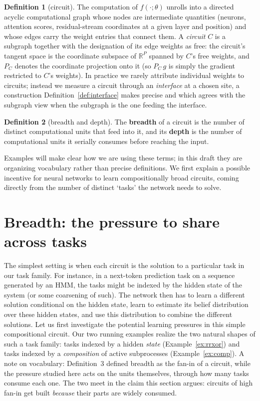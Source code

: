 \documentclass[10pt]{article}
\theoremstyle{definition}
\newtheorem{definition}{Definition}
\begin{document}
\begin{definition}[circuit]\label{def:circuit}
The computation of $f(\cdot;\theta)$ unrolls into a directed acyclic computational graph whose nodes are intermediate quantities (neurons, attention scores, residual-stream coordinates at a given layer and position) and whose edges carry the weight entries that connect them. A \emph{circuit} $C$ is a subgraph together with the designation of its edge weights as free: the circuit's tangent space is the coordinate subspace of $\mathbb{R}^P$ spanned by $C$'s free weights, and $P_C$ denotes the coordinate projection onto it (so $P_C\, g$ is simply the gradient restricted to $C$'s weights). In practice we rarely attribute individual weights to circuits; instead we measure a circuit through an \emph{interface} at a chosen site, a construction Definition~\ref{def:interface} makes precise and which agrees with the subgraph view when the subgraph is the one feeding the interface.
\end{definition}

\begin{definition}[breadth and depth]
The \textbf{breadth} of a circuit is the number of distinct computational units that feed into it, and its \textbf{depth} is the number of computational units it serially consumes before reaching the input.
\end{definition}

Examples will make clear how we are using these terms; in this draft they are organizing vocabulary rather than precise definitions. We first explain a possible incentive for neural networks to learn compositionally broad circuits, coming directly from the number of distinct `tasks' the network needs to solve.

\section{Breadth: the pressure to share across tasks}

The simplest setting is when each circuit is the solution to a particular task in our task family. For instance, in a next-token prediction task on a sequence generated by an HMM, the tasks might be indexed by the hidden state of the system (or some coarsening of such). The network then has to learn a different solution conditional on the hidden state, learn to estimate its belief distribution over these hidden states, and use this distribution to combine the different solutions. Let us first investigate the potential learning pressures in this simple compositional circuit. Our two running examples realize the two natural shapes of such a task family: tasks indexed by a hidden \emph{state} (Example~\ref{ex:rrxor}) and tasks indexed by a \emph{composition} of active subprocesses (Example~\ref{ex:comp}). A note on vocabulary: Definition~3 defined breadth as the fan-in of a circuit, while the pressure studied here acts on the units themselves, through how many tasks consume each one. The two meet in the claim this section argues: circuits of high fan-in get built \emph{because} their parts are widely consumed.
\end{document}
